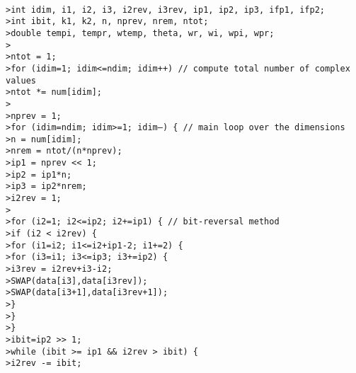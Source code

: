\texttt{ \\
>\quad int idim, i1, i2, i3, i2rev, i3rev, ip1, ip2, ip3, ifp1, ifp2; \\
>\quad int ibit, k1, k2, n, nprev, nrem, ntot; \\
>\quad double tempi, tempr, wtemp, theta, wr, wi, wpi, wpr; \\
>\quad \\
>\quad ntot = 1; \\
>\quad for (idim=1; idim<=ndim; idim++) // compute total number of complex values \\
>\quad \qquad ntot *= num[idim]; \\
>\quad \\
>\quad nprev = 1; \\
>\quad for (idim=ndim; idim>=1; idim--) \{ // main loop over the dimensions \\
>\quad \qquad n = num[idim]; \\
>\quad \qquad nrem = ntot/(n*nprev); \\
>\quad \qquad ip1 = nprev << 1; \\
>\quad \qquad ip2 = ip1*n; \\
>\quad \qquad ip3 = ip2*nrem; \\
>\quad \qquad i2rev = 1; \\
>\quad \\
>\quad \qquad for (i2=1; i2<=ip2; i2+=ip1) \{ // bit-reversal method \\
>\quad \qquad\qquad if (i2 < i2rev) \{ \\
>\quad \qquad\qquad\qquad for (i1=i2; i1<=i2+ip1-2; i1+=2) \{ \\
>\quad \qquad\qquad\qquad\qquad for (i3=i1; i3<=ip3; i3+=ip2) \{ \\
>\quad \qquad\qquad\qquad\qquad\qquad i3rev = i2rev+i3-i2; \\
>\quad \qquad\qquad\qquad\qquad\qquad SWAP(data[i3],data[i3rev]); \\
>\quad \qquad\qquad\qquad\qquad\qquad SWAP(data[i3+1],data[i3rev+1]); \\
>\quad \qquad\qquad\qquad\qquad \} \\
>\quad \qquad\qquad\qquad \} \\
>\quad \qquad\qquad \} \\
>\quad \qquad\qquad ibit=ip2 >> 1; \\
>\quad \qquad\qquad while (ibit >= ip1 \&\& i2rev > ibit) \{ \\
>\quad \qquad\qquad\qquad i2rev -= ibit; \\
}
